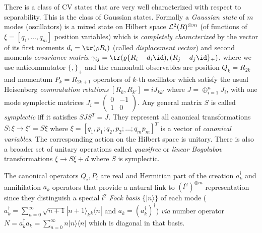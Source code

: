 \documentclass[rmp,12pt,preprint]{revtex4-2}
\begin{document}
There is a class of CV states that are very well characterized with
respect to separability. This is the class of Gaussian states.
Formally a {\it Gaussian state} of $m$ modes (oscillators) is a
mixed state on Hilbert space ${\cal L}^{2}(R)^{\otimes m}$ (of
functions of $\xi=[q_{1},\ldots,q_{m}]$ position variables) which is
{\it completely characterized} by the vector of its first moments
$d_{i}={\tr}(\varrho R_{i})$ (called {\it displacement vector}) and
second moments {\it covariance matrix}
$\gamma_{ij}={\tr}(\varrho\{R_{i}-d_{i}\id),(R_{j}-d_{j}\id\}_{+})$, where
we use anticommutator $\{ , \}_{+}$ and the cannonball observables
are position $Q_{k}=R_{2k}$ and momentum $P_{k}=R_{2k+1}$ operators
of $k$-th oscillator which satisfy the usual Heisenberg {\it
commutation relations} $[R_{k},R_{k'}]=iJ_{kk'}$ where
$J=\oplus_{i=1}^{n} J_{i}$, with one mode symplectic matrices
$J_{i}=\left(
\begin{array}{cc}
0 &-1\\
1 &0
\end{array} \right)$.
Any general matrix $S$ is called {\it symplectic} iff it satisfies
$SJS^{T}=J$. They represent all canonical transformations
$S:\xi\rightarrow \xi'=S\xi$ where
$\xi=[q_{1},p_{1};q_{2},p_{2};\ldots;q_{m}p_{m}]^{T}$ is a vector of
{\it canonical variables}. The corresponding action on the Hilbert
space is unitary. There is also a broader set of unitary operations
called {\it quasifree} or {\it linear Bogolubov} transformations
$\xi \rightarrow S \xi + d$ where $S$ is symplectic.

The canonical operators $Q_{i},P_{i}$ are real and Hermitian part of
the creation $a_{k}^{\dagger}$ and annihilation $a_{k}$ operators
that provide a natural link to $(l^{2})^{\otimes m}$ representation
since they distinguish a special $l^{2}$ {\it Fock basis} $\{
|n\rangle \}$ of each mode ($a_{k}^{\dagger}=\sum_{n=0}^{\infty}
\sqrt{n+1}|n+1 \rangle_{k} {}_{k}\langle n|$ and
$a_{k}=(a_{k}^\dagger)^\dagger $) {\it via} number operator
$N=a_{k}^{\dagger}a_{k}=\sum_{n=0}^{\infty}n|n\rangle\langle n|$
which is diagonal in that basis.
\end{document}
